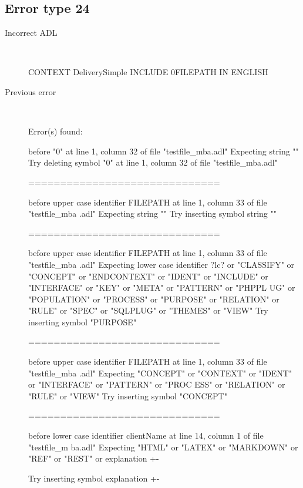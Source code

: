 \hrulefill

\subsection{Error type 24}
  \begin{description}
  \item[Incorrect ADL]~\\
\begin{adl}
CONTEXT DeliverySimple INCLUDE 0FILEPATH IN ENGLISH\end{adl}
  \item[Previous error]~\\
\begin{haskell}
Error(s) found:

before "0" at line 1, column 32 of file "testfile_mba.adl"
Expecting string ""
Try deleting symbol "0" at line 1, column 32 of file "testfile_mba.adl"

==============================

before upper case identifier FILEPATH at line 1, column 33 of file "testfile_mba
.adl"
Expecting string ""
Try inserting symbol string ""

==============================

before upper case identifier FILEPATH at line 1, column 33 of file "testfile_mba
.adl"
Expecting lower case identifier ?lc? or "CLASSIFY" or "CONCEPT" or "ENDCONTEXT"
or "IDENT" or "INCLUDE" or "INTERFACE" or "KEY" or "META" or "PATTERN" or "PHPPL
UG" or "POPULATION" or "PROCESS" or "PURPOSE" or "RELATION" or "RULE" or "SPEC"
or "SQLPLUG" or "THEMES" or "VIEW"
Try inserting symbol "PURPOSE"

==============================

before upper case identifier FILEPATH at line 1, column 33 of file "testfile_mba
.adl"
Expecting "CONCEPT" or "CONTEXT" or "IDENT" or "INTERFACE" or "PATTERN" or "PROC
ESS" or "RELATION" or "RULE" or "VIEW"
Try inserting symbol "CONCEPT"

==============================

before lower case identifier clientName at line 14, column 1 of file "testfile_m
ba.adl"
Expecting "HTML" or "LATEX" or "MARKDOWN" or "REF" or "REST" or explanation {+-}

Try inserting symbol explanation {+-}


\end{haskell}
\end{description}
